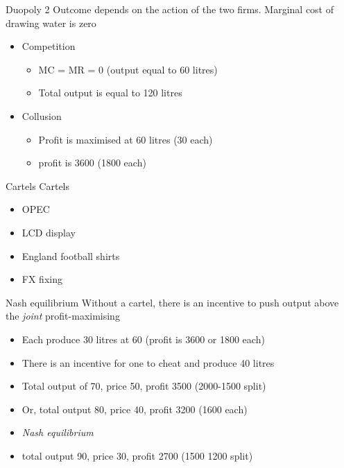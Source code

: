 \documentclass[14pt,xcolor=pdftex,dvipsnames,table]{beamer}\usepackage[]{graphicx}\usepackage[]{color}
\begin{document}
\begin{frame}{Duopoly 2}
Outcome depends on the action of the two firms. Marginal cost of drawing water is zero
\pause
\begin{itemize}[<+-| alert@+>]
\item Competition
\begin{itemize} 
\item MC = MR = 0 (output equal to 60 litres)
\item Total output is equal to 120 litres
\end{itemize}
\item Collusion
\begin{itemize}
\item Profit is maximised at 60 litres (30 each)
\item profit is 3600 (1800 each) 
\end{itemize}
\end{itemize}

\end{frame}

\begin{frame}{Cartels}
Cartels
\begin{itemize}[<+-| alert@+>]
\item OPEC
\item LCD display 
\item England football shirts
\item FX fixing
\end{itemize}
\end{frame}

\begin{frame}{Nash equilibrium}
Without a cartel, there is an incentive to push output above the \emph{joint} profit-maximising
\pause
\begin{itemize}[<+-| alert@+>]
\item Each produce 30 litres at 60 (profit is 3600 or 1800 each)
\item There is an incentive for one to cheat and produce 40 litres
\item Total output of 70, price 50, profit 3500 (2000-1500 split)
\item Or, total output 80, price 40, profit 3200 (1600 each)
\item \emph{Nash equilibrium}
\item total output 90, price 30, profit 2700 (1500 1200 split) 
\end{itemize}
\end{frame}
\end{document}
